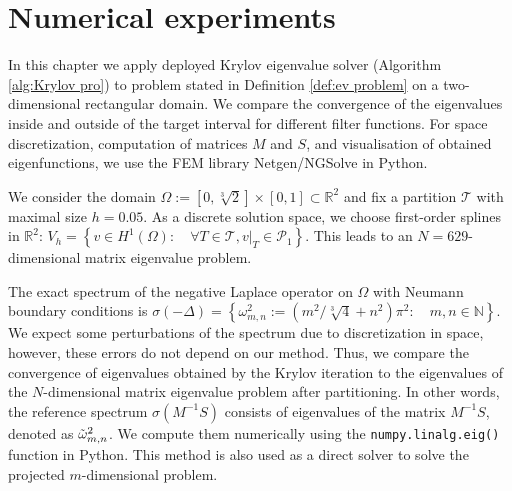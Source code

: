 \documentclass[a4paper,11pt,bibliography=totoc,listof=totoc,headinclude=true,cleardoublepage=empty,oneside]{scrbook}
\newcommand{\R}{\mathbb{R}}
\newcommand{\N}{\mathbb{N}}
\newcommand{\dffv}{\Tilde{\beta}_{\Vec{\alpha}}}
\newcommand{\e}{\mathrm{end}}
\begin{document}

\chapter{Numerical experiments}\label{chapter:experiments}
In this chapter we apply deployed Krylov eigenvalue solver (Algorithm \ref{alg:Krylov pro}) to problem stated in Definition \ref{def:ev problem} on a two-dimensional rectangular domain. We compare the convergence of the eigenvalues inside and outside of the target interval for different filter functions. For space discretization, computation of matrices $M$ and $S$, and visualisation of obtained eigenfunctions, we use the FEM library Netgen/NGSolve in Python.

We consider the domain $\Omega := \left[0, \sqrt[3]{2}\right]\times\left[0, 1\right] \subset \R^2$ and fix a partition $\mathcal{T}$ with maximal size $h = 0.05$. As a discrete solution space, we choose first-order splines in $\R^2$: $V_h = \left\{v \in H^1(\Omega) : \quad \forall T \in \mathcal{T}, v|_T \in \mathcal{P}_1\right\}$. This leads to an $N=629$-dimensional matrix eigenvalue problem. 

The exact spectrum of the negative Laplace operator on $\Omega$ with Neumann boundary conditions is $ \sigma(-\Delta) = \left\{\omega^2_{m,n} := \left(m^2/\sqrt[3]{4} + n^2\right)\pi^2 : \quad m, n \in \N \right\}$. We expect some perturbations of the spectrum due to discretization in space, however, these errors do not depend on our method. Thus, we compare the convergence of eigenvalues obtained by the Krylov iteration to the eigenvalues of the $N$-dimensional matrix eigenvalue problem after partitioning. In other words, the reference spectrum $\sigma(M^{-1}S)$ consists of eigenvalues of the matrix $M^{-1}S$, denoted as $\Tilde{\omega}_{m,n}^2$. We compute them numerically using the \texttt{numpy.linalg.eig()} function in Python. This method is also used as a direct solver to solve the projected $m$-dimensional problem.
\end{document}
